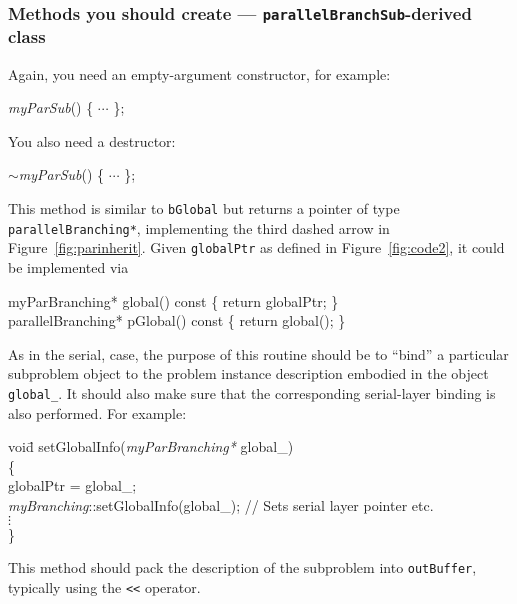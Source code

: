 \subsubsection{Methods you should create ---
  \texttt{parallelBranchSub}-derived class}

Again, you need an empty-argument constructor, for example:
\begin{codeblock}
\emph{myParSub}() \{  $\cdots$ \}; \\
\end{codeblock}

You also need a destructor:
\begin{codeblock}
$\sim$\emph{myParSub}() \{ $\cdots$ \}; \\
\end{codeblock}

This method is similar to \texttt{bGlobal} but returns a pointer of
type \texttt{parallelBranching*}, implementing the third dashed arrow
in Figure~\ref{fig:parinherit}.  Given \texttt{globalPtr} as defined
in Figure~\ref{fig:code2}, it could be implemented via
\begin{codeblock}
myParBranching* global() const \{ return globalPtr; \} \\
parallelBranching* pGlobal() const \{ return global(); \}
\end{codeblock}

As in the
serial, case, the purpose of this routine should be to ``bind'' a
particular subproblem object to the problem instance description embodied in
the object \texttt{global\_}.  It should also make sure that the
corresponding serial-layer binding is also performed.  For example:
\begin{codeblock}
voi\=d setGlobalInfo(\emph{myParBranching*} global\_) \\
\{ \\
\> globalPtr = global\_; \\
\> \emph{myBranching}::setGlobalInfo(global\_);
  // Sets serial layer pointer etc. \\
\> $\vdots$\\
\}
\end{codeblock}

This method should pack the description of the subproblem into
\texttt{outBuffer}, typically using the \texttt{<<} operator.

